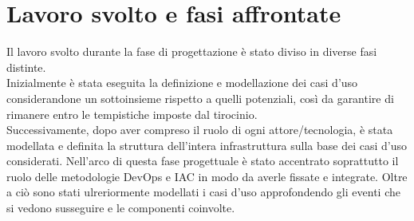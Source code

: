 \documentclass[a4paper,12pt]{report}
\begin{document}
\section{Lavoro svolto e fasi affrontate}
Il lavoro svolto durante la fase di progettazione è stato diviso in diverse fasi distinte.\\
Inizialmente è stata eseguita la definizione e modellazione dei casi d'uso considerandone un sottoinsieme rispetto a quelli potenziali, così da garantire di rimanere entro le tempistiche imposte dal tirocinio.\\
Successivamente, dopo aver compreso il ruolo di ogni attore/tecnologia, è stata modellata e definita la struttura dell'intera infrastruttura sulla base dei casi d'uso considerati. Nell'arco di questa fase progettuale è stato accentrato soprattutto il ruolo delle metodologie DevOps e IAC in modo da averle fissate e integrate. Oltre a ciò sono stati ulreriormente modellati i casi d'uso approfondendo gli eventi che si vedono susseguire e le componenti coinvolte. \\ \\ \\ \\ \\
\end{document}
